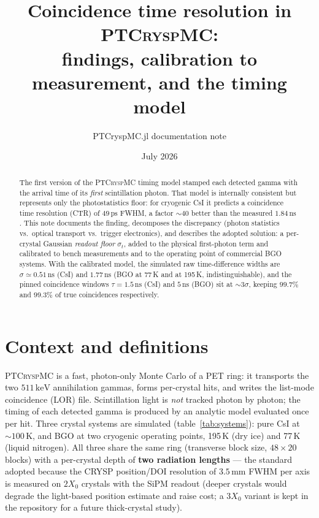 \documentclass[11pt,a4paper]{article}
\title{Coincidence time resolution in \textsc{PTCryspMC}:\\
       findings, calibration to measurement, and the timing model}
\author{PTCryspMC.jl documentation note}
\date{July 2026}
\newcommand{\ns}{\,\mathrm{ns}}
\newcommand{\ps}{\,\mathrm{ps}}
\newcommand{\keV}{\,\mathrm{keV}}
\begin{document}
\maketitle

\begin{abstract}
\noindent
The first version of the \textsc{PTCryspMC} timing model stamped each detected gamma with the
arrival time of its \emph{first} scintillation photon. That model is internally consistent but
represents only the photostatistics floor: for cryogenic CsI it predicts a coincidence time
resolution (CTR) of $49\ps$ FWHM, a factor ${\sim}40$ better than the measured $1.84\ns$
\cite{Soleti2024}. This note documents the finding, decomposes the discrepancy
(photon statistics vs.\ optical transport vs.\ trigger electronics), and describes the adopted
solution: a per-crystal Gaussian \emph{readout floor} $\sigma_t$, added to the physical
first-photon term and calibrated to bench measurements and to the operating point of commercial
BGO systems. With the calibrated model, the simulated raw time-difference widths are
$\sigma \simeq 0.51\ns$ (CsI) and $1.77\ns$ (BGO at 77\,K and at 195\,K, indistinguishable),
and the pinned coincidence windows $\tau = 1.5\ns$ (CsI) and $5\ns$ (BGO) sit at
${\sim}3\sigma$, keeping $99.7\%$ and $99.3\%$ of true coincidences respectively.
\end{abstract}

\section{Context and definitions}

\textsc{PTCryspMC} is a fast, photon-only Monte Carlo of a PET ring: it transports the two
$511\keV$ annihilation gammas, forms per-crystal hits, and writes the list-mode coincidence
(LOR) file. Scintillation light is \emph{not} tracked photon by photon; the timing of each
detected gamma is produced by an analytic model evaluated once per hit. Three crystal systems
are simulated (table~\ref{tab:systems}): pure CsI at ${\sim}100$\,K, and BGO at two cryogenic
operating points, 195\,K (dry ice) and 77\,K (liquid nitrogen). All three share the same ring
(transverse block size, $48\times20$ blocks) with a per-crystal depth of \textbf{two radiation
lengths} --- the standard adopted because the CRYSP position/DOI resolution of
$3.5$\,mm FWHM per axis is measured on $2X_0$ crystals with the SiPM readout (deeper crystals
would degrade the light-based position estimate and raise cost; a $3X_0$ variant is kept in
the repository for a future thick-crystal study).
\end{document}
